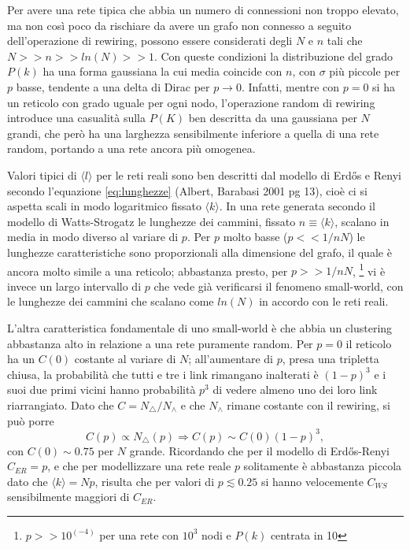 Per avere una rete tipica che abbia un numero di connessioni non troppo elevato, ma non così poco da rischiare da avere un grafo non connesso a seguito dell'operazione di rewiring, possono essere considerati degli $N$ e $n$ tali che $N>>n>>ln(N)>>1$. Con queste condizioni la distribuzione del grado $P(k)$ ha una forma gaussiana la cui media coincide con $n$, con $\sigma$ più piccole per $p$ basse, tendente a una delta di Dirac per $p \rightarrow 0$. Infatti, mentre con $p=0$ si ha un reticolo con grado uguale per ogni nodo, l'operazione random di rewiring introduce una casualità sulla $P(K)$ ben descritta da una gaussiana per $N$ grandi, che però ha una larghezza sensibilmente inferiore a quella di una rete random, portando a una rete ancora più omogenea.  

Valori tipici di $\langle l \rangle$ per le reti reali sono ben descritti dal modello di Erdős e Renyi secondo l'equazione \ref{eq:lunghezze} (Albert, Barabasi 2001 pg 13),
cioè ci si aspetta scali in modo logaritmico fissato $\langle k \rangle$. In una rete generata secondo il modello di Watts-Strogatz le lunghezze dei cammini, fissato $n \equiv \langle k \rangle$, scalano in media in modo diverso al variare di $p$. Per $p$ molto basse ($p << 1/nN$) le lunghezze caratteristiche sono proporzionali alla dimensione del grafo, il quale è ancora molto simile a una reticolo; abbastanza presto, per $p >> 1/nN$, \footnote{$p >> 10^(-4)$ per una rete con $10^3$ nodi e $P(k)$ centrata in 10} vi è invece un largo intervallo di $p$ che vede già verificarsi il fenomeno small-world, con le lunghezze dei cammini che scalano come $ln(N)$ in accordo con le reti reali.  

L'altra caratteristica fondamentale di uno small-world è che abbia un clustering abbastanza alto in relazione a una rete puramente random. Per $p = 0$ il reticolo ha un $C(0)$ costante al variare di $N$; all'aumentare di $p$, presa una tripletta chiusa, la probabilità che tutti e tre i link rimangano inalterati è $(1-p)^3$  e i suoi due primi vicini hanno probabilità $p^3$ di vedere almeno uno dei loro link riarrangiato. Dato che $C=N_\triangle/N_\wedge$ e che $N_\wedge$ rimane costante con il rewiring, si può porre 
\[C(p) \propto N_\triangle (p) \Rightarrow C(p) \sim C(0)(1-p)^3, \]
con $C(0) \sim 0.75$ per $N$ grande. Ricordando che per il modello di Erdős-Renyi $C_{ER}=p$, e che per modellizzare una rete reale $p$ solitamente è abbastanza piccola dato che $\langle k \rangle = Np$, risulta che per valori di $p \lesssim 0.25$ si hanno velocemente $C_{WS}$ sensibilmente maggiori di $C_{ER}$.

